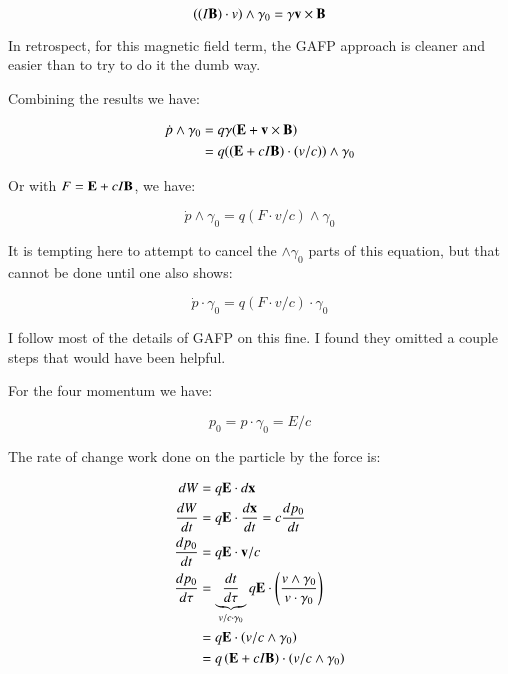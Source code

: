 \documentclass{article}
\begin{document}
\begin{equation*}
((I\mathbf{B}) \cdot v) \wedge \gamma_0 = \gamma \mathbf{v} \times \mathbf{B}
\end{equation*}

In retrospect, for this magnetic field term, the GAFP approach is cleaner and easier than to try to do it the dumb way.

Combining the results we have:

\begin{align*}
\dot{p} \wedge \gamma_0 
&= q \gamma ( \mathbf{E} + \mathbf{v} \times \mathbf{B} ) \\
&= q (( \mathbf{E} + c I \mathbf{B} ) \cdot (v/c)) \wedge \gamma_0 \\
\end{align*}

Or with $F = \mathbf{E} + c I \mathbf{B}$, we have:

\begin{equation}\label{eqn:pvec}
\dot{p} \wedge \gamma_0 = q ( F \cdot v/c ) \wedge \gamma_0
\end{equation}

It is tempting here to attempt to cancel the $\wedge \gamma_0$ parts of this equation, but that cannot be done
until one also shows:

\begin{equation*}
\dot{p} \cdot \gamma_0 = q ( F \cdot v/c ) \cdot \gamma_0
\end{equation*}

I follow most of the details of GAFP on this fine.  I found they omitted a couple steps that would have been helpful.

For the four momentum we have:

\begin{equation*}
p_0 = p \cdot \gamma_0 = E/c
\end{equation*}

The rate of change work done on the particle by the force is:

\begin{align*}
dW &= q\mathbf{E} \cdot d\mathbf{x} \\
\frac{dW}{dt} &= q\mathbf{E} \cdot \frac{d\mathbf{x}}{dt} = c \frac{dp_0}{dt} \\
\frac{dp_0}{dt} &= q\mathbf{E} \cdot \mathbf{v}/c \\
\frac{dp_0}{d\tau} &= \underbrace{\frac{dt}{d\tau}}_{v/c \cdot \gamma_0} q\mathbf{E} \cdot \left( \frac{v \wedge \gamma_0}{v \cdot \gamma_0} \right) \\
                   &= q\mathbf{E} \cdot \left(v/c \wedge \gamma_0\right) \\
                   &= q \left(\mathbf{E} + c I \mathbf{B}\right) \cdot \left(v/c \wedge \gamma_0\right) \\
\end{align*}
\end{document}
